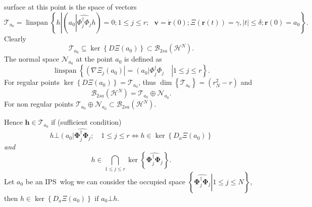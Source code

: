 \documentclass[aps,preprint]{revtex4}%
\begin{document}
surface at this point is the space of vectors
\begin{equation}
\mathcal{T}_{a_{0}}=\operatorname{linspan}\left\{  h\left\vert \left(
a_{0}\left\vert \widehat{\Phi_{j}^{\dagger}\Phi_{j}}\right.  h\right)
=0\right.  ;1\leq j\leq r;\text{ }\mathbf{v=\dot{r}}\left(  0\right)
;\Xi\left(  \mathbf{r}\left(  t\right)  \right)  =\gamma,\left\vert
t\right\vert \leq\delta;\mathbf{r}\left(  0\right)  =a_{0}\right\}  .
\end{equation}
Clearly
\begin{equation}
\mathcal{T}_{a_{0}}\subseteq\ker\left\{  D\Xi\left(  a_{0}\right)  \right\}
\subset\mathcal{B}_{2sa}\left(  \mathcal{H}^{N}\right)  .
\end{equation}
The normal space $\mathcal{N}_{a_{0}}$ at the point $a_{0}$ is defined as
\begin{equation}
\operatorname{linspan}\left\{  \left.  \left(  \overset{}{\nabla\Xi_{j}\left(
a_{0}\right)  }\right\vert =\left(  \overset{}{a_{0}}\right\vert \Phi
_{j}^{\dagger}\Phi_{j}\quad\right\vert 1\leq j\leq r\right\}  .
\end{equation}
For regular points $\ker\left\{  D\Xi\left(  a_{0}\right)  \right\}
=\mathcal{T}_{a_{0}}$, thus $\dim\left\{  \mathcal{T}_{a_{0}}\right\}
=\left(  r_{N}^{2}-r\right)  $ and
\begin{equation}
\mathcal{B}_{2sa}\left(  \mathcal{H}^{N}\right)  =\mathcal{T}_{a_{0}}%
\oplus\mathcal{N}_{a_{0}}.
\end{equation}
For non regular points $\mathcal{T}_{a_{0}}\oplus\mathcal{N}_{a_{0}}%
\subset\mathcal{B}_{2sa}\left(  \mathcal{H}^{N}\right)  .$

Hence $\mathbf{h\in}\mathcal{T}_{a_{0}}$ if (sufficient condition)
\begin{equation}
h\mathbf{\bot}\left(  a_{0}\right\vert \widehat{\mathbf{\Phi}_{j}^{\dagger
}\mathbf{\Phi}_{j}};\quad1\leq j\leq r\Leftrightarrow h\in\ker\left\{
D_{a}\Xi\left(  a_{0}\right)  \right\}
\end{equation}
\emph{and}
\begin{equation}
h\in\bigcap\limits_{1\leq j\leq r}\ker\left\{  \widehat{\mathbf{\Phi}%
_{j}^{\dagger}\mathbf{\Phi}_{j}}\right\}  .
\end{equation}
Let $a_{0}$ be an IPS\ wlog we can consider the occupied space $\left\{
\left.  \widehat{\mathbf{\Phi}_{j}^{\dagger}\mathbf{\Phi}_{j}}\right\vert
1\leq j\leq N\right\}  $, then $h\in\ker\left\{  D_{a}\Xi\left(  a_{0}\right)
\right\}  $ if $a_{0}\mathbf{\bot}h$.
\end{document}

